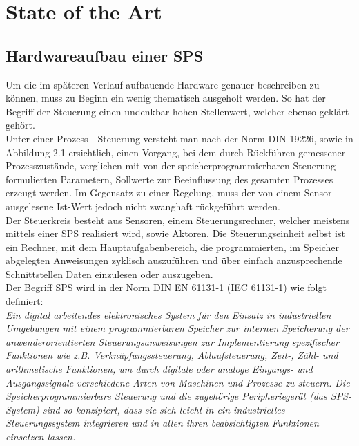 
\chapter{State of the Art} \label{chapter:stateoftheart}

	\section{Hardwareaufbau einer SPS}
	
	Um die im späteren Verlauf aufbauende Hardware genauer beschreiben zu können, muss zu Beginn ein wenig thematisch ausgeholt werden. So hat der Begriff der Steuerung einen undenkbar hohen Stellenwert, welcher ebenso geklärt gehört.\\
	
	Unter einer Prozess - Steuerung versteht man nach der Norm DIN 19226, sowie in Abbildung 2.1 ersichtlich, einen Vorgang, bei dem durch Rückführen gemessener Prozesszustände, verglichen mit von der speicherprogrammierbaren Steuerung formulierten Parametern, Sollwerte zur Beeinflussung des gesamten Prozesses erzeugt werden. Im Gegensatz zu einer Regelung, muss der von einem Sensor ausgelesene Ist-Wert jedoch nicht zwanghaft rückgeführt werden. \\
	
	Der Steuerkreis besteht aus Sensoren, einem Steuerungsrechner, welcher meistens mittels einer SPS realisiert wird, sowie Aktoren. Die Steuerungseinheit selbst ist ein Rechner, mit dem Hauptaufgabenbereich, die programmierten, im Speicher abgelegten Anweisungen zyklisch auszuführen und über einfach anzusprechende Schnittstellen Daten einzulesen oder auszugeben. \cite{mseitz_sps} \\
	
	Der Begriff SPS wird in der Norm DIN EN 61131-1 (IEC 61131-1) wie folgt definiert:\\
	
	\glqq \textit{Ein digital arbeitendes elektronisches System für den Einsatz in industriellen Umgebungen mit einem programmierbaren Speicher zur internen Speicherung der anwenderorientierten Steuerungsanweisungen zur Implementierung spezifischer Funktionen wie z.B. Verknüpfungssteuerung, Ablaufsteuerung, Zeit-, Zähl- und arithmetische Funktionen, um durch digitale oder analoge Eingangs- und Ausgangssignale verschiedene Arten von Maschinen und Prozesse zu steuern. Die Speicherprogrammierbare Steuerung und die zugehörige Peripheriegerät (das SPS- System) sind so konzipiert, dass sie sich leicht in ein industrielles Steuerungssystem integrieren und in allen ihren beabsichtigten Funktionen einsetzen lassen.}\grqq \space \cite{sps_programmierung}\\
 
